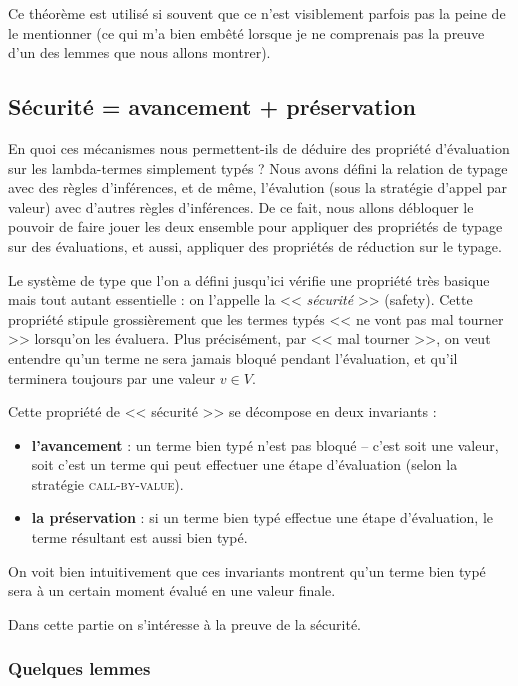 \documentclass[11pt]{article}
\begin{document}
Ce théorème est utilisé si souvent que ce n'est visiblement parfois pas la peine de le mentionner (ce qui m'a bien embêté lorsque je ne comprenais pas la preuve d'un des lemmes que nous allons montrer).

\subsection{Sécurité = avancement + préservation}

En quoi ces mécanismes nous permettent-ils de déduire des propriété d'évaluation sur les lambda-termes simplement typés ? Nous avons défini la relation de typage avec des règles d'inférences, et de même, l'évalution (sous la stratégie d'appel par valeur) avec d'autres règles d'inférences. De ce fait, nous allons débloquer le pouvoir de faire jouer les deux ensemble pour appliquer des propriétés de typage sur des évaluations, et aussi, appliquer des propriétés de réduction sur le typage.

Le système de type que l'on a défini jusqu'ici vérifie une propriété très basique mais tout autant essentielle : on l'appelle la << \textit{sécurité} >> (safety). Cette propriété stipule grossièrement que les termes typés << ne vont pas mal tourner >> lorsqu'on les évaluera. Plus précisément, par << mal tourner >>, on veut entendre qu'un terme ne sera jamais bloqué pendant l'évaluation, et qu'il terminera toujours par une valeur $v\in V$.

Cette propriété de << sécurité >> se décompose en deux invariants :
\begin{itemize}
    \item \textbf{l'avancement} : un terme bien typé n'est pas bloqué -- c'est soit une valeur, soit c'est un terme qui peut effectuer une étape d'évaluation (selon la stratégie {\scshape{call-by-value}}).
    \item \textbf{la préservation} : si un terme bien typé effectue une étape d'évaluation, le terme résultant est aussi bien typé.
\end{itemize}

On voit bien intuitivement que ces invariants montrent qu'un terme bien typé sera à un certain moment évalué en une valeur finale.

Dans cette partie on s'intéresse à la preuve de la sécurité.

\subsubsection{Quelques lemmes}
\end{document}
